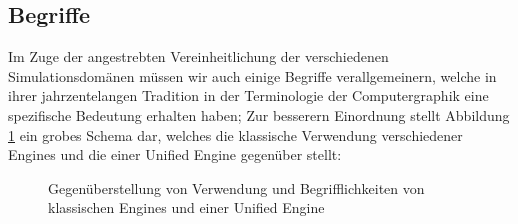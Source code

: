 	


\subsection{Begriffe}

Im Zuge der angestrebten Vereinheitlichung der  verschiedenen Simulationsdomänen müssen wir auch einige Begriffe verallgemeinern, welche in ihrer jahrzentelangen Tradition in der Terminologie der Computergraphik eine spezifische Bedeutung erhalten haben;
Zur besserern Einordnung stellt Abbildung \ref{fig:classicalVsUnified} ein grobes Schema dar, welches die klassische Verwendung verschiedener Engines und die einer Unified Engine gegenüber stellt:



	\begin{figure}[ht]
		\def\svgwidth{\textwidth}
	    
		\caption{Gegenüberstellung von Verwendung und Begrifflichkeiten von klassischen Engines und einer Unified Engine}
		\label{fig:classicalVsUnified}
	\end{figure}
	




